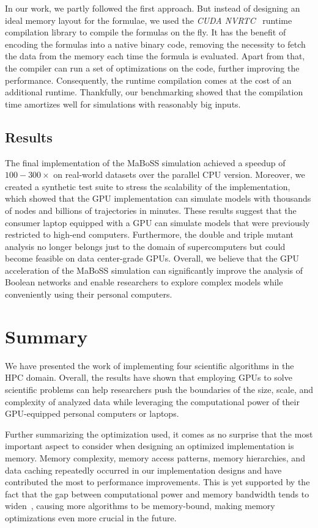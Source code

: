 In our work, we partly followed the first approach. But instead of designing an ideal memory layout for the formulae, we used the \emph{CUDA NVRTC}~\cite{nvrtc-online} runtime compilation library to compile the formulas on the fly. It has the benefit of encoding the formulas into a native binary code, removing the necessity to fetch the data from the memory each time the formula is evaluated. Apart from that, the compiler can run a set of optimizations on the code, further improving the performance. Consequently, the runtime compilation comes at the cost of an additional runtime. Thankfully, our benchmarking showed that the compilation time amortizes well for simulations with reasonably big inputs.

\subsection{Results}

The final implementation of the MaBoSS simulation achieved a speedup of $100-300\times$ on real-world datasets over the parallel CPU version. Moreover, we created a synthetic test suite to stress the scalability of the implementation, which showed that the GPU implementation can simulate models with thousands of nodes and billions of trajectories in minutes. These results suggest that the consumer laptop equipped with a GPU can simulate models that were previously restricted to high-end computers. Furthermore, the double and triple mutant analysis no longer belongs just to the domain of supercomputers but could become feasible on data center-grade GPUs. Overall, we believe that the GPU acceleration of the MaBoSS simulation can significantly improve the analysis of Boolean networks and enable researchers to explore complex models while conveniently using their personal computers.

\section{Summary}

We have presented the work of implementing four scientific algorithms in the HPC domain. Overall, the results have shown that employing GPUs to solve scientific problems can help researchers push the boundaries of the size, scale, and complexity of analyzed data while leveraging the computational power of their GPU-equipped personal computers or laptops.

Further summarizing the optimization used, it comes as no surprise that the most important aspect to consider when designing an optimized implementation is memory. Memory complexity, memory access patterns, memory hierarchies, and data caching repeatedly occurred in our implementation designs and have contributed the most to performance improvements. This is yet supported by the fact that the gap between computational power and memory bandwidth tends to widen~\cite{zhang2023perks}, causing more algorithms to be memory-bound, making memory optimizations even more crucial in the future.

